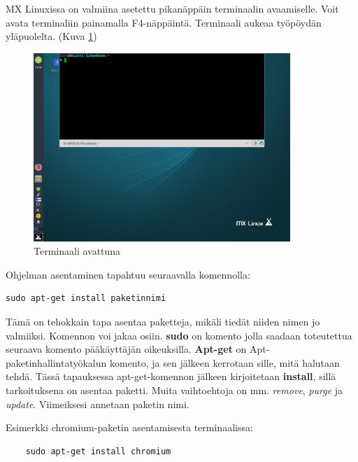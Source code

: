 \documentclass[a4paper, 12pt, finnish]{article}
\begin{document}
MX Linuxissa on valmiina asetettu pikanäppäin terminaalin avaamiselle. Voit avata terminaliin painamalla F4-näppäintä. Terminaali aukeaa työpöydän yläpuolelta. (Kuva \ref{fig:terminal})
\begin{figure}[htpb]
    \begin{center}
        \includegraphics[width=0.866\textwidth]{ymparisto/terminal}
        \caption{Terminaali avattuna}
        \label{fig:terminal}
    \end{center}
\end{figure}

Ohjelman asentaminen tapahtuu seuraavalla komennolla:
\begin{lstlisting}
sudo apt-get install paketinnimi
\end{lstlisting}

Tämä on tehokkain tapa asentaa paketteja, mikäli tiedät niiden nimen jo valmiiksi. Komennon voi jakaa osiin. \textbf{sudo} on komento jolla saadaan toteutettua seuraava komento pääkäyttäjän oikeuksilla. \textbf{Apt-get} on Apt-paketinhallintatyökalun komento, ja sen jälkeen kerrotaan sille, mitä halutaan tehdä. Tässä tapauksessa apt-get-komennon jälkeen kirjoitetaan \textbf{install}, sillä tarkoituksena on asentaa paketti. Muita vaihtoehtoja on mm. \textit{remove}, \textit{purge} ja \textit{update}. Viimeiksesi annetaan paketin nimi.

Esimerkki chromium-paketin asentamisesta terminaalissa:
\begin{lstlisting}
    sudo apt-get install chromium
\end{lstlisting}
\end{document}
